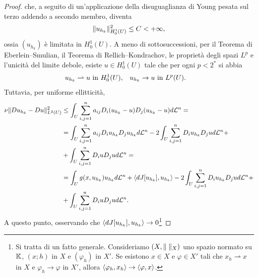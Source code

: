 \begin{proof}
che, a seguito di un'applicazione della disuguaglianza di Young pesata sul terzo addendo a secondo membro, diventa
\[ \lVert u_{h_k}\rVert^2_{H^1_0(U)} \le C <+\infty, \]
ossia $(u_{h_k})$ è limitata in $H^1_0(U)$. A meno di sottosuccessioni, per il Teorema di Eberlein--Smulian, il Teorema di Rellich--Kondrachov, le proprietà degli spazi $L^p$ e l'unicità del limite debole, esiste $u \in H^1_0(U)$ tale che per ogni $p < 2^\ast$ si abbia
\begin{align*}
	u_{h_k} \rightharpoonup u & \textup{ in } H^1_0(U), & u_{h_k} \to u & \textup{ in } L^p(U).
\end{align*}
Tuttavia, per uniforme ellitticità,
\begin{align*}
\nu \lVert Du_{h_k}-Du\rVert_{L^2(U)}^2 &\le \int_U \sum_{i,j=1}^{n} a_{ij} D_i(u_{h_k}-u)D_j(u_{h_k}-u) d\mathcal{L}^n = \\
&= \int_U \sum_{i,j=1}^{n} a_{ij}D_iu_{h_k} D_j u_{h_k} d\mathcal{L}^n - 2 \int_U \sum_{i,j=1}^{n}D_iu_{h_k}D_ju d\mathcal{L}^n + \\
&+\int_U \sum_{i,j=1}^{n}D_iuD_ju d\mathcal{L}^n = \\
&= \int_U g(x,u_{h_k})u_{h_k}d\mathcal{L}^n + \braket{dJ[u_{h_k}],u_{h_k}} - 2 \int_U \sum_{i,j=1}^{n}D_iu_{h_k}D_ju d\mathcal{L}^n + \\
&+ \int_U \sum_{i,j=1}^{n}D_iuD_ju d\mathcal{L}^n.
\end{align*}
A questo punto, osservando che $\braket{dJ[u_{h_k}],u_{h_k}} \to 0$\footnote{Si tratta di un fatto generale. Consideriamo $(X,\lVert\;\rVert_X)$ uno spazio normato su $\mathbb{K}$, $(x;h)$ in $X$ e $(\varphi_h)$ in $X'$. Se esistono $x \in X$ e $\varphi \in X'$ tali che $x_h \rightharpoonup x$ in $X$ e $\varphi_h \to \varphi$ in $X'$, allora $\braket{\varphi_h,x_h} \to \braket{\varphi,x}$.

}
\end{proof}
